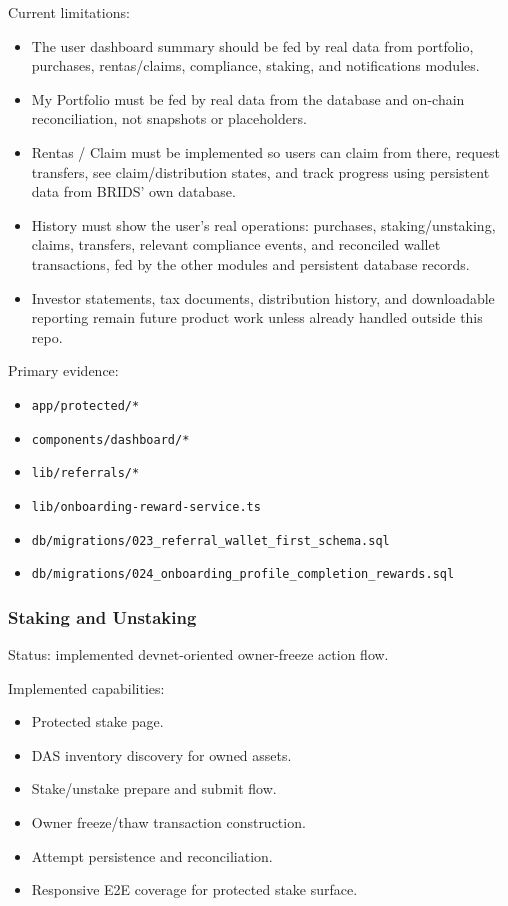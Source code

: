 \documentclass[
  10pt,
  letterpaper,
]{article}
\providecommand{\tightlist}{%
  \setlength{\itemsep}{0pt}\setlength{\parskip}{0pt}}
\let\oldtexttt\texttt
\renewcommand{\texttt}[1]{\oldtexttt{\small #1}}
\begin{document}
Current limitations:

\begin{itemize}
\tightlist
\item
  The user dashboard summary should be fed by real data from portfolio,
  purchases, rentas/claims, compliance, staking, and notifications
  modules.
\item
  My Portfolio must be fed by real data from the database and on-chain
  reconciliation, not snapshots or placeholders.
\item
  Rentas / Claim must be implemented so users can claim from there,
  request transfers, see claim/distribution states, and track progress
  using persistent data from BRIDS' own database.
\item
  History must show the user's real operations: purchases,
  staking/unstaking, claims, transfers, relevant compliance events, and
  reconciled wallet transactions, fed by the other modules and
  persistent database records.
\item
  Investor statements, tax documents, distribution history, and
  downloadable reporting remain future product work unless already
  handled outside this repo.
\end{itemize}

Primary evidence:

\begin{itemize}
\tightlist
\item
  \texttt{app/protected/*}
\item
  \texttt{components/dashboard/*}
\item
  \texttt{lib/referrals/*}
\item
  \texttt{lib/onboarding-reward-service.ts}
\item
  \texttt{db/migrations/023\_referral\_wallet\_first\_schema.sql}
\item
  \texttt{db/migrations/024\_onboarding\_profile\_completion\_rewards.sql}
\end{itemize}

\subsubsection{Staking and Unstaking}\label{staking-and-unstaking}

Status: implemented devnet-oriented owner-freeze action flow.

Implemented capabilities:

\begin{itemize}
\tightlist
\item
  Protected stake page.
\item
  DAS inventory discovery for owned assets.
\item
  Stake/unstake prepare and submit flow.
\item
  Owner freeze/thaw transaction construction.
\item
  Attempt persistence and reconciliation.
\item
  Responsive E2E coverage for protected stake surface.
\end{itemize}
\end{document}

